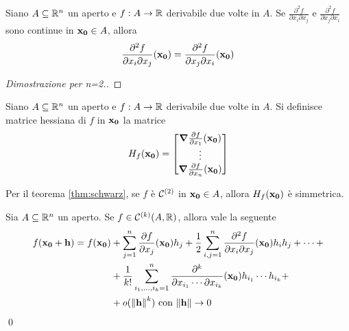 \begin{theorem}
    [di Schwarz]\label{thm:schwarz}
    Siano $A \subseteq \mathbb{R}^n$ un aperto e $f: A \to \mathbb{R}$ derivabile due volte in $A$. Se $\frac{\partial ^2 f}{\partial x_i \partial x_j}$ e $\frac{\partial^2 f}{\partial x_j \partial x_i}$ sono continue in $\vb{x_0} \in A$, allora
    \begin{equation*}
        \frac{\partial ^2 f}{\partial x_i \partial x_j}(\vb{x_0}) = \frac{\partial^2  f}{\partial x_j \partial x_i}(\vb{x_0})
    \end{equation*}
\end{theorem}

\begin{proof}
    [Dimostrazione per n=2.] %
\end{proof}

\begin{definition}
    Siano $A \subseteq \mathbb{R}^n$ un aperto e $f: A \to \mathbb{R}$ derivabile due volte in $A$. Si definisce matrice hessiana di $f$ in $\vb{x_0}$ la matrice
    \begin{equation*}
        H_f(\vb{x_0}) =
        \begin{bmatrix}
            \grad \frac{\partial f}{\partial x_1}(\vb{x_0})\\
            \vdots\\
            \grad \frac{\partial f}{\partial x_n}(\vb{x_0})
        \end{bmatrix}
    \end{equation*}
\end{definition}

\begin{remark}
    Per il teorema \ref{thm:schwarz}, se $f$ è $\mathcal{C}^{(2)}$ in $\vb{x_0} \in A$, allora $H_f(\vb{x_0})$ è simmetrica.
\end{remark}

\begin{theorem}
    Sia $A \subseteq \mathbb{R}^n$ un aperto. Se $f \in \mathcal{C}^{(k)}(A, \mathbb{R})$, allora vale la seguente
    \begin{align*}
        f(\vb{x_0}+ \vb{h})= f(\vb{x_0})&+\sum_{j=1}^{n}\frac{\partial f}{\partial x_j}(\vb{x_0})h_j + \frac{1}{2}\sum_{i,j=1}^{n}\frac{\partial^2 f}{\partial x_i \partial x_j}(\vb{x_0})h_ih_j+\cdots+\\
        &+\frac{1}{k!}\sum_{i_1,\dots,i_k=1}^n\frac{\partial^k}{\partial x_{i_1}\cdots\partial x_{i_k}}(\vb{x_0})h_{i_1}\cdots h_{i_k} +\\
        &+o (\norm{\vb{h}}^k) \text{ con } \norm{\vb{h}} \to 0
    \end{align*}
    \qed
\end{theorem}

